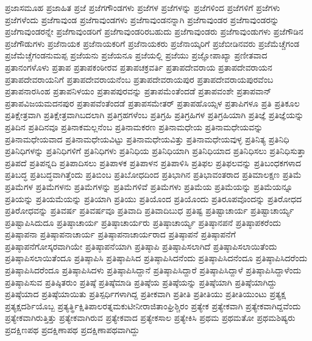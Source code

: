 {ಪ್ರಜಾಸಮೂಹ
ಪ್ರಜಾಹಿತ
ಪ್ರಜೆ
ಪ್ರಜೆಗಗೌಂಡಗಳು
ಪ್ರಜೆಗಳ
ಪ್ರಜೆಗಳನ್ನು
ಪ್ರಜೆಗಳಿಂದ
ಪ್ರಜೆಗಳಿಗೆ
ಪ್ರಜೆಗಳು
ಪ್ರಜೆಗಳೆಂದು
ಪ್ರಜೆಗಾವುಂಡ
ಪ್ರಜೆಗಾವುಂಡಗಳು
ಪ್ರಜೆಗಾವುಂಡನನ್ನಾಗಿ
ಪ್ರಜೆಗಾವುಂಡರ
ಪ್ರಜೆಗಾವುಂಡರನ್ನು
ಪ್ರಜೆಗಾವುಂಡರನ್ನೇ
ಪ್ರಜೆಗಾವುಂಡರಿಗೆ
ಪ್ರಜೆಗಾವುಂಡರಿರಬಹುದು
ಪ್ರಜೆಗಾವುಂಡರು
ಪ್ರಜೆಗಾವುಂಡುಗಳು
ಪ್ರಜೆಗೌಡಿನ
ಪ್ರಜೆಗೌಡುಗಳು
ಪ್ರಜೆನಾಯಕ
ಪ್ರಜೆನಾಯಕರಿಗೆ
ಪ್ರಜೆನಾಯಕರು
ಪ್ರಜೆನಾಯ್ಕರಿಗೆ
ಪ್ರಜೆಬೀಡಿನವರು
ಪ್ರಜೆಮೆಚ್ಚೆಗಂಡ
ಪ್ರಜೆಮೆಚ್ಚೆಗಂಡನುಮಪ್ಪ
ಪ್ರಜೆಯನು
ಪ್ರಜೆಯನೂ
ಪ್ರಜೆಯಲ್ಲಿ
ಪ್ರಜೆಯು
ಪ್ರಜ್ಞೋಪಾಖ್ಯಾ
ಪ್ರಣೀತವಾದ
ಪ್ರತಾನಂಗಳೊಳು
ಪ್ರತಾಪ
ಪ್ರತಾಪಕಂಠೀರವ
ಪ್ರತಾಪಚಕ್ರವರ್ತಿ
ಪ್ರತಾಪದೇವರಾಯ
ಪ್ರತಾಪದೇವರಾಯನ
ಪ್ರತಾಪದೇವರಾಯನಿಗೆ
ಪ್ರತಾಪದೇವರಾಯನೆಂಬ
ಪ್ರತಾಪದೇವರಾಯಪುರ
ಪ್ರತಾಪದೇವರಾಯಪುರವೆಂಬ
ಪ್ರತಾಪನಾರಸಿಂಹ
ಪ್ರತಾಪನಿಳಯಂ
ಪ್ರತಾಪಪುರವನ್ನು
ಪ್ರತಾಪಮೆಂತೆಂದಡೆ
ಪ್ರತಾಪವಂಶೇ
ಪ್ರತಾಪವಾನ್
ಪ್ರತಾಪವಿಜಯಮದನಪುರ
ಪ್ರತಾಪವೆಂತೆಂದಡೆ
ಪ್ರತಾಪಸಮೇತರ್
ಪ್ರತಾಪಹೊಯ್ಸಳ
ಪ್ರತಾಪಿಗಳೂ
ಪ್ರತಿ
ಪ್ರತಿಕೂಲ
ಪ್ರತಿಕ್ಷೇತ್ರವಾಗಿ
ಪ್ರತಿಕ್ಷೇತ್ರವಾಗಿಬದಲಾಗಿ
ಪ್ರತಿಗ್ರಹಗಳೆಂಬ
ಪ್ರತಿಗ್ರಹಿ
ಪ್ರತಿಗ್ರಹಿಗಳ
ಪ್ರತಿಗ್ರಹಿಯಾಗಿ
ಪ್ರತಿಜ್ಞೆ
ಪ್ರತಿಜ್ಞೆಯನ್ನು
ಪ್ರತಿದಿನ
ಪ್ರತಿದಿನವೂ
ಪ್ರತಿನಾಕಮಲ್ಲನೆಂಬ
ಪ್ರತಿನಾಮಕರಣ
ಪ್ರತಿನಾಮಧೇಯ
ಪ್ರತಿನಾಮಧೇಯವನ್ನು
ಪ್ರತಿನಾಮಧೇಯವಾದ
ಪ್ರತಿನಾಮಧೇಯವಿಟ್ಟು
ಪ್ರತಿನಾಮಧೇಯವಿತ್ತು
ಪ್ರತಿನಾಮಧೇಯವುಳ್ಳ
ಪ್ರತಿನಿತ್ಯ
ಪ್ರತಿನಿಧಿ
ಪ್ರತಿನಿಧಿಗಳನ್ನು
ಪ್ರತಿನಿಧಿಗಳಿಗೆ
ಪ್ರತಿನಿಧಿಗಳು
ಪ್ರತಿನಿಧಿಯ
ಪ್ರತಿನಿಧಿಯಾಗಿ
ಪ್ರತಿನಿಧಿಯಾದ
ಪ್ರತಿನಿಧಿಸಲು
ಪ್ರತಿನಿಧಿಸುತ್ತಾ
ಪ್ರತಿಪದೆ
ಪ್ರತಿಪನ್ನದಿ
ಪ್ರತಿಪಾದಿಸಲು
ಪ್ರತಿಪಾಳಕ
ಪ್ರತಿಪಾಳನ
ಪ್ರತಿಪಾಳಿಸಿ
ಪ್ರತಿಫಲ
ಪ್ರತಿಫಲವನ್ನು
ಪ್ರತಿಬಂಧಕಗಳಾದ
ಪ್ರತಿಬದ್ಧ
ಪ್ರತಿಬದ್ಧವಾಗಿತ್ತೆಂದು
ಪ್ರತಿಬಿಂಬ
ಪ್ರತಿಬೋಧದಿಂದ
ಪ್ರತಿಭಾಗಿನ
ಪ್ರತಿಭಾವಂತರಾದ
ಪ್ರತಿಮಾಲಕ್ಷಣ
ಪ್ರತಿಮೆ
ಪ್ರತಿಮೆಗಳ
ಪ್ರತಿಮೆಗಳನು
ಪ್ರತಿಮೆಗಳನ್ನು
ಪ್ರತಿಮೆಗಳಿವೆ
ಪ್ರತಿಮೆಗಳು
ಪ್ರತಿಮೆಯ
ಪ್ರತಿಮೆಯನ್ನು
ಪ್ರತಿಮೆಯನ್ನೂ
ಪ್ರತಿಯನ್ನು
ಪ್ರತಿಯಮೆಯನ್ನು
ಪ್ರತಿಯಾಗಿ
ಪ್ರತಿಯು
ಪ್ರತಿಯೊಂದ
ಪ್ರತಿಯೊಂದು
ಪ್ರತಿರೂಪವೊಂದನ್ನು
ಪ್ರತಿರೋಧದ
ಪ್ರತಿರೋಧವನ್ನು
ಪ್ರತಿವರ್ಷ
ಪ್ರತಿವರ್ಷವೂ
ಪ್ರತಿವಾದಿ
ಪ್ರತಿವಾದಿಬುಧ
ಪ್ರತಿಷ್ಟ
ಪ್ರತಿಷ್ಟಾಚಾರ್ಯ
ಪ್ರತಿಷ್ಟಾಚಾರ್ಯ್ಯ
ಪ್ರತಿಷ್ಟಾಪಿಸಿದುದೂ
ಪ್ರತಿಷ್ಠಾಚಾರ್ಯ
ಪ್ರತಿಷ್ಠಾಚಾರ್ಯರು
ಪ್ರತಿಷ್ಠಾಚಾರ್ಯ್ಯ
ಪ್ರತಿಷ್ಠಾನಪನೆ
ಪ್ರತಿಷ್ಠಾಪಕರೆಂದು
ಪ್ರತಿಷ್ಠಾಪನಾ
ಪ್ರತಿಷ್ಠಾಪನಾಚಾರ್ಯ
ಪ್ರತಿಷ್ಠಾಪನಾಚಾರ್ಯರಾದ
ಪ್ರತಿಷ್ಠಾಪನೆ
ಪ್ರತಿಷ್ಠಾಪನೆಗೆ
ಪ್ರತಿಷ್ಠಾಪನೆಗೋಸ್ಕರವಾಗಿಯೇ
ಪ್ರತಿಷ್ಠಾಪನೆಯಾಗಿ
ಪ್ರತಿಷ್ಠಾಪಿ
ಪ್ರತಿಷ್ಠಾಪಿಸಲಾಗಿದೆ
ಪ್ರತಿಷ್ಠಾಪಿಸಲಾಯಿತೆಂದು
ಪ್ರತಿಷ್ಠಾಪಿಸಲಾಯಿತೆಂದೂ
ಪ್ರತಿಷ್ಠಾಪಿಸಿ
ಪ್ರತಿಷ್ಠಾಪಿಸಿದ
ಪ್ರತಿಷ್ಠಾಪಿಸಿದನೆಂದು
ಪ್ರತಿಷ್ಠಾಪಿಸಿದನೆಂದೂ
ಪ್ರತಿಷ್ಠಾಪಿಸಿದರೆಂದು
ಪ್ರತಿಷ್ಠಾಪಿಸಿದರೆಂದೂ
ಪ್ರತಿಷ್ಠಾಪಿಸಿದಳು
ಪ್ರತಿಷ್ಠಾಪಿಸಿದ್ದಾನೆ
ಪ್ರತಿಷ್ಠಾಪಿಸಿದ್ದಾರೆ
ಪ್ರತಿಷ್ಠಾಪಿಸಿದ್ದಾಳೆ
ಪ್ರತಿಷ್ಠಾಪಿಸಿದ್ದಾಳೆಂದು
ಪ್ರತಿಷ್ಠಾಪಿಸುವ
ಪ್ರತಿಷ್ಠಿತರುಂ
ಪ್ರತಿಷ್ಠೆ
ಪ್ರತಿಷ್ಠೆಮಾಡಿ
ಪ್ರತಿಷ್ಠೆಯ
ಪ್ರತಿಷ್ಠೆಯನ್ನು
ಪ್ರತಿಷ್ಠೆಯಾಗಿ
ಪ್ರತಿಷ್ಠೆಯಾಗಿದ್ದು
ಪ್ರತಿಷ್ಠೆಯಾದ
ಪ್ರತಿಷ್ಠೆಯಾಯಿತು
ಪ್ರತಿಸ್ಪರ್ಧಿಗಳಾಗಿದ್ದ
ಪ್ರತೀಕವಾಗಿ
ಪ್ರತೀತಿ
ಪ್ರತೀತಿಯು
ಪ್ರತೀತಿಯುಂಟು
ಪ್ರತ್ಯಕ್ಷ
ಪ್ರತ್ಯಕ್ಷದರ್ಶಿಯೊಬ್ಬ
ಪ್ರತ್ಯರ್ತ್ಥಿಕ್ಷಿತಿಪಾಲರತ್ನಮಕುಟೀನೀರಾಜಿತಾಂಘ್ರಿಶ್ಚಿರಂ
ಪ್ರತ್ಯೇಕ
ಪ್ರತ್ಯೇಕವಾಗಿ
ಪ್ರತ್ಯೇಕವಾಗಿದ್ದವೆಂದು
ಪ್ರತ್ಯೇಕವಾಗಿರುತ್ತಿತ್ತು
ಪ್ರತ್ಯೇಕವಾಗಿರುವ
ಪ್ರತ್ಯೇಕವಾದ
ಪ್ರತ್ಯೇಕಸಾಲ
ಪ್ರತ್ಯೇಕಿಸಿ
ಪ್ರಥಮ
ಪ್ರಥಮತೋ
ಪ್ರಥಮಶಿಷ್ಯರು
ಪ್ರದಕ್ಷಿಣಪಥ
ಪ್ರದಕ್ಷಿಣಾಪಥ
ಪ್ರದಕ್ಷಿಣಾಪಥವಾಗಿದ್ದು
}
